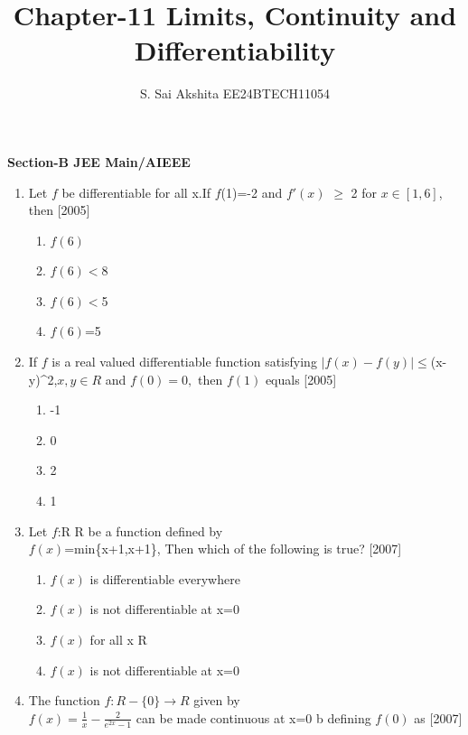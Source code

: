 \documentclass[journal,12pt,twocolumn]{IEEEtran}
\theoremstyle{remark}
\begin{document}

\vspace{3cm}

\title{\textbf{Chapter-11 Limits, Continuity and Differentiability}}
\author{S. Sai Akshita EE24BTECH11054}
\maketitle
\newpage
\bigskip

\renewcommand{\thefigure}{\theenumi}
\renewcommand{\thetable}{\theenumi}
\begin{large}
\textbf{Section-B JEE Main/AIEEE}
\end{large}
\begin{enumerate}
    \item[(21)] Let $f$ be differentiable for all x.If $f$(1)=-2 and $f'(x)$ $\geq$ 2 for $x \in [1,6]$, then   \hfill[2005]
\begin{enumerate}
\item $f(6)$ \geq{} \item $f(6)<$8\item $f(6)<$5\item $f(6)$=5
\end{enumerate}
    \item[(22)] If $f$ is a real valued differentiable function satisfying $\mid f(x)-f(y)\mid \leq$(x-y)^2,$x,y\in R$ and $f(0)=0,$ then $f(1)$ equals \hfill[2005]
    \begin{enumerate}
    \item -1\item 0\item 2\item 1
    \end{enumerate}
    \item[(23)] Let $f$:R\rightarrow\) R be a function defined by\\$f(x)$=min\{x+1,\mid\)x\mid\)+1\}, Then which of the following is true? \hfill[2007]
    \begin{enumerate}
    \item $f(x)$ is differentiable everywhere\item $f(x)$ is not differentiable at x=0\item $f(x)$ \geq{} for all x\in\) R\item$f(x)$ is not differentiable at x=0
    \end{enumerate}
    \item[(24)] The function $f:R-\{0\}\rightarrow R$ given by\\$f(x)=\frac{1}{x}-\frac{2}{e^{2x}-1}$ can be made continuous at x=0 b defining $f(0)$ as \hfill[2007]

\end{enumerate}
\end{document}
